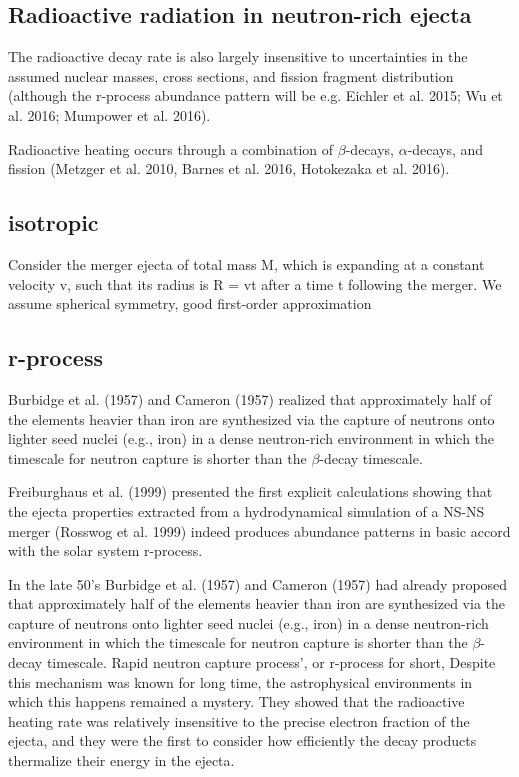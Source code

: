 \subsection{Radioactive radiation in neutron-rich ejecta}

The radioactive decay rate is also largely insensitive to uncertainties in the assumed nuclear masses, cross sections, and fission fragment distribution (although the r-process abundance pattern will be e.g. Eichler et al. 2015; Wu et al. 2016; Mumpower et al. 2016).

Radioactive heating occurs through a combination of $\beta$-decays, $\alpha$-decays, and fission (Metzger et al. 2010, Barnes et al. 2016, Hotokezaka et al. 2016). 

\subsection{isotropic}

Consider the merger ejecta of total mass M, which is expanding at a constant velocity v, such that its radius is R = vt after a time t following the merger. 
We assume spherical symmetry, good first-order approximation

\subsection{r-process}

Burbidge et al. (1957) and Cameron (1957) realized that approximately half of the elements heavier than iron are synthesized via the capture of neutrons onto lighter seed nuclei (e.g., iron) in a dense neutron-rich environment in which the timescale for neutron capture is shorter than the $\beta$-decay timescale.

Freiburghaus et al. (1999) presented the first explicit calculations showing that the ejecta properties extracted from a hydrodynamical simulation of a NS-NS merger (Rosswog et al. 1999) indeed produces abundance patterns in basic accord with the solar system r-process.

In the late 50's Burbidge et al. (1957) and Cameron (1957) had already proposed that approximately half of the elements heavier than iron are synthesized via the capture of neutrons onto lighter seed nuclei (e.g., iron) in a dense neutron-rich environment in which the timescale for neutron capture is shorter than the $\beta$-decay timescale.
Rapid neutron capture process', or r-process for short, 
Despite this mechanism was known for long time, the astrophysical environments in which this happens remained a mystery.
They showed that the radioactive heating rate was relatively insensitive to the precise electron fraction of the ejecta, and they were the first to consider how efficiently the decay products thermalize their energy in the ejecta.

